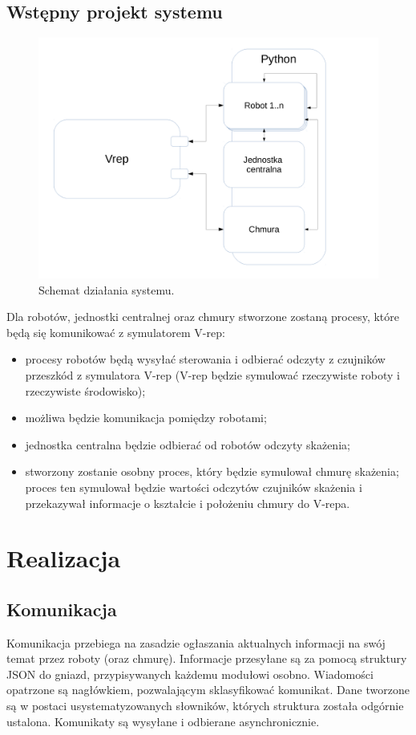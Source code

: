 \documentclass[a4paper, 12pt]{article}
\begin{document}
	\subsection{Wstępny projekt systemu}	
	\begin{figure}[h!]
		\centering
		\includegraphics[width=0.9\columnwidth]{img/schemat_sst_1.pdf}
		\caption{Schemat działania systemu.}
	\end{figure}
	Dla robotów, jednostki centralnej oraz chmury stworzone zostaną procesy, które będą się komunikować z symulatorem V-rep:
	\begin{itemize}
		\item procesy robotów będą wysyłać sterowania i odbierać odczyty z czujników przeszkód z symulatora V-rep (V-rep będzie symulować rzeczywiste roboty i rzeczywiste środowisko);
		\item możliwa będzie komunikacja pomiędzy robotami;
		\item jednostka centralna będzie odbierać od robotów odczyty skażenia;
		\item stworzony zostanie osobny proces, który będzie symulował chmurę skażenia; proces ten symulował będzie wartości odczytów czujników skażenia i przekazywał informacje o kształcie i położeniu chmury do V-repa.
	\end{itemize}
	
	\section{Realizacja}
	
	\subsection{Komunikacja}
	Komunikacja przebiega na zasadzie ogłaszania aktualnych informacji na swój temat przez roboty (oraz chmurę). Informacje przesyłane są za pomocą struktury JSON do gniazd, przypisywanych każdemu modułowi osobno.
	Wiadomości opatrzone są nagłówkiem, pozwalającym sklasyfikować komunikat. Dane tworzone są w postaci usystematyzowanych słowników, których struktura została odgórnie ustalona.
	Komunikaty są wysyłane i odbierane asynchronicznie.
\end{document}
